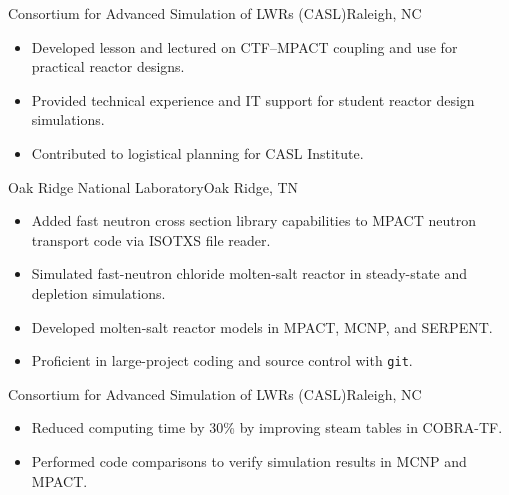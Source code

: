 \documentclass[letterpaper,11pt,nocolor,final]{moderncv}
\begin{document}
  {Consortium for Advanced Simulation of LWRs (CASL)}{Raleigh, NC}{}{
  \begin{itemize}
    \item Developed lesson and lectured on CTF--MPACT coupling and use for practical reactor designs.
    \item Provided technical experience and IT support for student reactor design simulations.
    \item Contributed to logistical planning for CASL Institute.
  \end{itemize}}

{Oak Ridge National Laboratory}{Oak Ridge, TN}{}{
  \begin{itemize}
    \item Added fast neutron cross section library capabilities to MPACT neutron transport code via ISOTXS file reader.
    \item Simulated fast-neutron chloride molten-salt reactor in steady-state and depletion simulations.
    \item Developed molten-salt reactor models in MPACT, MCNP, and SERPENT.
    \item Proficient in large-project coding and source control with 
      \texttt{git}.
  \end{itemize}}

{Consortium for Advanced Simulation of LWRs (CASL)}{Raleigh, NC}{}{
  \begin{itemize}
    \item Reduced computing time by 30\% by improving steam tables in COBRA-TF.
    \item Performed code comparisons to verify simulation results in MCNP and 
      MPACT.
  \end{itemize}}
\end{document}
